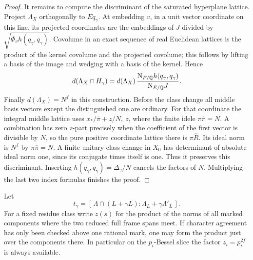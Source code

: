 \documentclass[a4paper,11pt]{article}
\theoremstyle{definition}
\theoremstyle{remark}
\numberwithin{equation}{section}
\begin{document}
\begin{proof}
It remains to compute the discriminant of the saturated
hyperplane lattice. Project \(\Lambda_X\) orthogonally to
\(Eq_\gamma\). At embedding \(v\), in a unit vector coordinate
on this line, its projected coordinates are the embeddings
of \(J\) divided by \(\sqrt{\Phi_v h(q_\gamma,q_\gamma)}\).
Covolume in an exact sequence of real Euclidean lattices is
the product of the kernel covolume and the projected
covolume; this follows by lifting a basis of the image and
wedging with a basis of the kernel. Hence
\[
 d(\Lambda_X\cap H_\gamma)
     =d(\Lambda_X)\,
       \frac{{\rm N}_{F/\mathbb Q} h(q_\gamma,q_\gamma)}
            {{\rm N}_{E/\mathbb Q}J}.
\]
Finally \(d(\Lambda_X)=N^f\) in this construction. Before
the class change all middle basis vectors except the distinguished
one are ordinary. For that coordinate the integral middle
lattice uses \(x_*/\bar\pi+z/N,\ z\), where the finite idele
\(\pi\bar\pi=N\). A combination has zero \(z\)-part precisely
when the coefficient of the first vector is divisible by \(N\),
so the pure positive coordinate lattice there is \(\pi\widehat R\).
Its ideal norm is \(N^f\) by \(\pi\bar\pi=N\).
A finite unitary class change in \(X_0\) has determinant of
absolute ideal norm one, since its conjugate times itself is
one. Thus it preserves this discriminant. Inserting
\(h(q_\gamma,q_\gamma)=\Delta_\gamma/N\) cancels the factors of
\(N\). Multiplying the last two index formulas finishes the proof.
\end{proof}

Let
\[
   t_\gamma=[\,\Lambda\cap(L+\gamma L):
                         \Lambda_L+\gamma\Lambda'_L\,].
\]
For a fixed residue class write \(z(s)\) for the product of the
norms of all marked components where the two reduced full frame
spans meet. If character agreement has only been checked above
one rational mark, one may form the product just over the
components there. In particular on the \(p_i\)-Bessel slice
the factor \(z_i=p_i^{2f}\) is always available.
\end{document}
